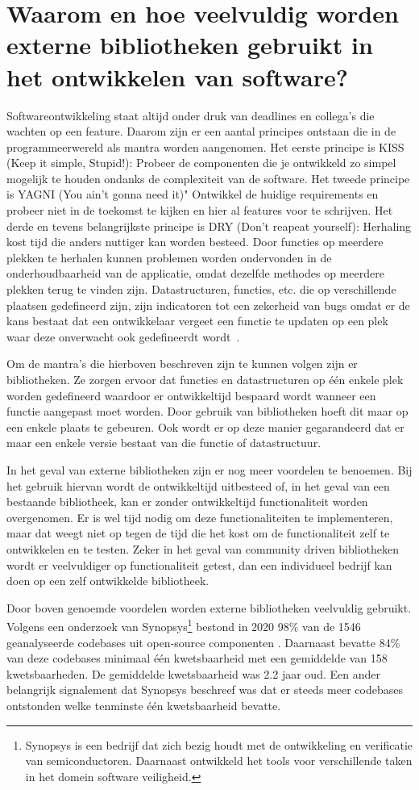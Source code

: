 \section{Waarom en hoe veelvuldig worden externe bibliotheken gebruikt in het ontwikkelen van software?}\label{sec:waarom-hoe}
Softwareontwikkeling staat altijd onder druk van deadlines en collega's die wachten op een feature. Daarom zijn er een aantal principes ontstaan die in de programmeerwereld als mantra worden aangenomen. Het eerste principe is KISS (Keep it simple, Stupid!): Probeer de componenten die je ontwikkeld zo simpel mogelijk te houden ondanks de complexiteit van de software. Het tweede principe is YAGNI (You ain't gonna need it)" Ontwikkel de huidige requirements en probeer niet in de toekomst te kijken en hier al features voor te schrijven. Het derde en tevens belangrijkste principe is DRY (Don't reapeat yourself): Herhaling kost tijd die anders nuttiger kan worden besteed. Door functies op meerdere plekken te herhalen kunnen problemen worden ondervonden in de onderhoudbaarheid van de applicatie, omdat dezelfde methodes op meerdere plekken terug te vinden zijn. Datastructuren, functies, etc. die op verschillende plaatsen gedefineerd zijn, zijn indicatoren tot een zekerheid van bugs omdat er de kans bestaat dat een ontwikkelaar vergeet een functie te updaten op een plek waar deze onverwacht ook gedefineerdt wordt~\citep{Papadopoulo:2021}.

Om de mantra's die hierboven beschreven zijn te kunnen volgen zijn er bibliotheken. Ze zorgen ervoor dat functies en datastructuren op één enkele plek worden gedefineerd waardoor er ontwikkeltijd bespaard wordt wanneer een functie aangepast moet worden. Door gebruik van bibliotheken hoeft dit maar op een enkele plaats te gebeuren. Ook wordt er op deze manier gegarandeerd dat er maar een enkele versie bestaat van die functie of datastructuur.

In het geval van externe bibliotheken zijn er nog meer voordelen te benoemen. Bij het gebruik hiervan wordt de ontwikkeltijd uitbesteed of, in het geval van een bestaande bibliotheek, kan er zonder ontwikkeltijd functionaliteit worden overgenomen. Er is wel tijd nodig om deze functionaliteiten te implementeren, maar dat weegt niet op tegen de tijd die het kost om de functionaliteit zelf te ontwikkelen en te testen. Zeker in het geval van community driven bibliotheken wordt er veelvuldiger op functionaliteit getest, dan een individueel bedrijf kan doen op een zelf ontwikkelde bibliotheek.

Door boven genoemde voordelen worden externe bibliotheken veelvuldig gebruikt. Volgens een onderzoek van Synopsys\footnote{Synopsys is een bedrijf dat zich bezig houdt met de ontwikkeling en verificatie van semiconductoren. Daarnaast ontwikkeld het tools voor verschillende taken in het domein software veiligheid.} bestond in 2020 98\% van de 1546 geanalyseerde codebases uit open-source componenten \citep{Synopsys:2021}. Daarnaast bevatte 84\% van deze codebases minimaal één kwetsbaarheid met een gemiddelde van 158 kwetsbaarheden. De gemiddelde kwetsbaarheid was 2.2 jaar oud. Een ander belangrijk signalement dat Synopsys beschreef was dat er steeds meer codebases ontstonden welke tenminste één kwetsbaarheid bevatte.

